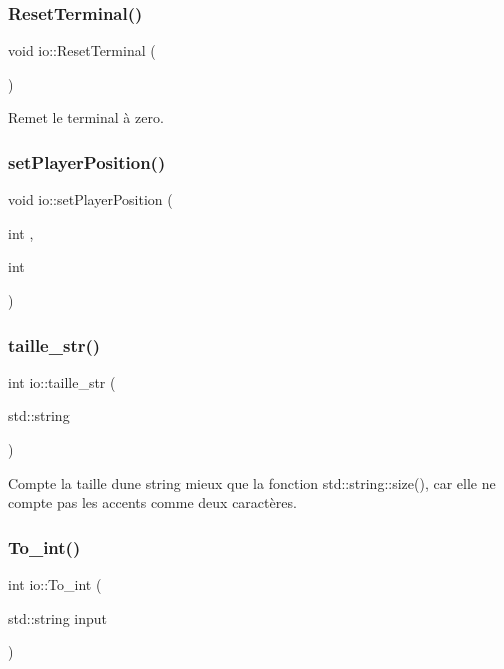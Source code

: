 \subsubsection{\texorpdfstring{Reset\+Terminal()}{ResetTerminal()}}
{\footnotesize\ttfamily void io\+::\+Reset\+Terminal (\begin{DoxyParamCaption}{ }\end{DoxyParamCaption})}



Remet le terminal à zero. 

\mbox{\label{namespaceio_ac1340cd13ac838a1d1cfaa0d25a4bbfb}} 
\subsubsection{\texorpdfstring{set\+Player\+Position()}{setPlayerPosition()}}
{\footnotesize\ttfamily void io\+::set\+Player\+Position (\begin{DoxyParamCaption}\item[{int}]{,  }\item[{int}]{ }\end{DoxyParamCaption})}

\mbox{\label{namespaceio_a0161a5c00ad8e7222f3a052e7c9fa67b}} 
\subsubsection{\texorpdfstring{taille\+\_\+str()}{taille\_str()}}
{\footnotesize\ttfamily int io\+::taille\+\_\+str (\begin{DoxyParamCaption}\item[{std\+::string}]{ }\end{DoxyParamCaption})}



Compte la taille d\textquotesingle{}une string mieux que la fonction std\+::string\+::size(), car elle ne compte pas les accents comme deux caractères. 

\mbox{\label{namespaceio_a495fffe3be2fea58511cedcfcea5dbbd}} 
\subsubsection{\texorpdfstring{To\+\_\+int()}{To\_int()}}
{\footnotesize\ttfamily int io\+::\+To\+\_\+int (\begin{DoxyParamCaption}\item[{std\+::string}]{input }\end{DoxyParamCaption})}



